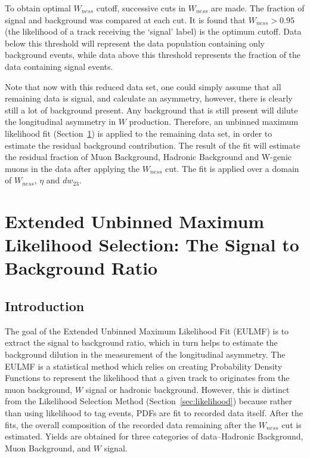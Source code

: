 To obtain optimal $W_{ness}$ cutoff, successive cuts in $W_{ness}$ are made. The
fraction of signal and background was compared at each cut. It is found that
$W_{ness} > 0.95$ (the likelihood of a track receiving the `signal' label) is
the optimum cutoff. Data below this threshold will represent the data population
containing only background events, while data above this threshold represents
the fraction of the data containing signal events.

Note that now with this reduced data set, one could simply assume that all
remaining data is signal, and calculate an asymmetry, however, there is clearly
still a lot of background present. Any background that is still present will
dilute the longitudinal asymmetry in $W$ production. Therefore, an unbinned
maximum likelihood fit (Section~\ref{sec:sbr}) is applied to the remaining data
set, in order to estimate the residual background contribution. The result of
the fit will estimate the residual fraction of Muon Background, Hadronic
Background and W-genic muons in the data after applying the $W_{ness}$ cut.  The
fit is applied over a domain of $W_{ness}$, $\eta$ and $dw_{23}$. 

\clearpage
\section{Extended Unbinned Maximum Likelihood Selection: The Signal to
Background Ratio}
\label{sec:sbr}

\subsection{Introduction}
\label{sec:sbr_intro}
The goal of the Extended Unbinned Maximum Likelihood Fit (EULMF) is to extract
the signal to background ratio, which in turn helps to estimate the background
dilution in the measurement of the longitudinal asymmetry. The EULMF is a
statistical method which relies on creating Probability Density Functions to
represent the likelihood that a given track to originates from the muon
background, $W$ signal or hadronic background. However, this is distinct from
the Likelihood Selection Method (Section~\ref{sec:likelihood}) because rather
than using likelihood to tag events, PDFs are fit to recorded data itself.
After the fits, the overall composition of the recorded data remaining after the
$W_{ness}$ cut is estimated. Yields are obtained for three categories of
data--Hadronic Background, Muon Background, and $W$ signal. 

